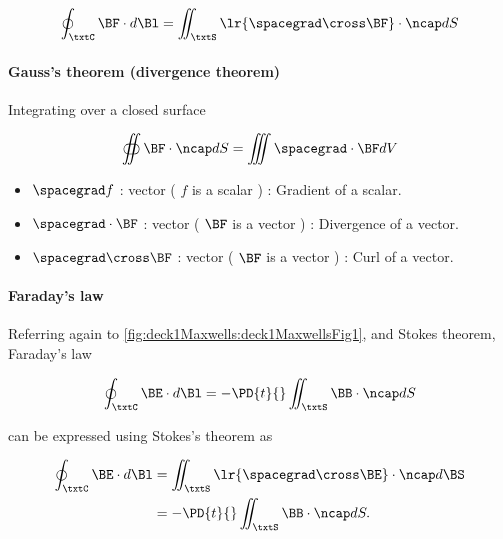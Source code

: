 \begin{equation}\label{eqn:uwavesLecture1:140}
\oint_\txtC \BF \cdot d\Bl = \iint_\txtS \lr{ \spacegrad \cross \BF } \cdot \ncap dS
\end{equation}

\paragraph{Gauss's theorem (divergence theorem)}

Integrating over a closed surface

\begin{equation}\label{eqn:uwavesLecture1:160}
\oiint \BF \cdot \ncap dS = \iiint \spacegrad \cdot \BF dV
\end{equation}

\begin{itemize}
\item \( \spacegrad f \) :  vector ( \( f \) is a scalar ) : Gradient of a scalar.
\item \( \spacegrad \cdot \BF \) :  vector ( \( \BF \) is a vector ) : Divergence of a vector.
\item \( \spacegrad \cross \BF \) :  vector ( \( \BF \) is a vector ) : Curl of a vector.
\end{itemize}

\paragraph{Faraday's law}

Referring again to \cref{fig:deck1Maxwells:deck1MaxwellsFig1}, and Stokes theorem, Faraday's law

\begin{equation}\label{eqn:uwavesLecture1:180}
\oint_\txtC \BE \cdot d\Bl = - \PD{t}{} \iint_\txtS \BB \cdot \ncap dS
\end{equation}

can be expressed using Stokes's theorem as

\begin{equation}\label{eqn:uwavesLecture1:200}
\begin{aligned}
\oint_\txtC \BE \cdot d\Bl &= \iint_\txtS \lr{ \spacegrad \cross \BE} \cdot \ncap d\BS
\\ &=
- \PD{t}{} \iint_\txtS \BB \cdot \ncap dS.
\end{aligned}
\end{equation}

